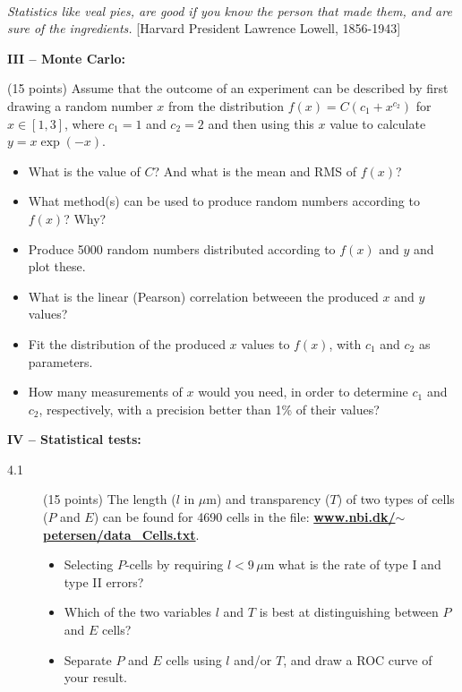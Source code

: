 \documentclass[11pt]{article}
\begin{document}

\noindent
\hrulefill\\
\emph{Statistics like veal pies, are good if you know the person that made them, and are sure of the ingredients.}
  \phantom{} \hfill [Harvard President Lawrence Lowell, 1856-1943]\\[-2ex]



\newpage

\noindent
{\bf III -- Monte Carlo:}
\begin{description}
\vspace*{-1ex}
\item[3.1] (15 points) Assume that the outcome of an experiment can be described by
  first drawing a random number $x$ from the distribution $f(x) = C (c_1 + x^{c_2})$ for $x \in [1, 3]$,
  where $c_1 = 1$ and $c_2 = 2$ and then using this $x$ value to calculate $y = x \exp(-x)$.
  \begin{itemize}
    \item What is the value of $C$? And what is the mean and RMS of $f(x)$?
    \item What method(s) can be used to produce random numbers according to $f(x)$? Why?
    \item Produce 5000 random numbers distributed according to $f(x)$ and $y$ and plot these.
    \item What is the linear (Pearson) correlation betweeen the produced $x$ and $y$ values?
    \item Fit the distribution of the produced $x$ values to $f(x)$, with $c_1$ and $c_2$ as parameters.
    \item How many measurements of $x$ would you need, in order to determine $c_1$ and $c_2$,
      respectively, with a precision better than 1\% of their values?
  \end{itemize}
\end{description}



\noindent
{\bf IV -- Statistical tests:}
\begin{description}
\item[4.1] (15 points)
  The length ($l$ in $\mu$m) and transparency ($T$) of two types of cells ($P$ and $E$) can be found for
  4690 cells in the file:
  \href{http://www.nbi.dk/~petersen/data\_Cells.txt}{\bf www.nbi.dk/$\sim$petersen/data\_Cells.txt}.
  \vspace*{-1ex}
  \begin{itemize}
    \item Selecting $P$-cells by requiring $l < 9 \,\mu$m what is the rate of type I and type II errors?
    \item Which of the two variables $l$ and $T$ is best at distinguishing between $P$ and $E$ cells?
    \item Separate $P$ and $E$ cells using $l$ and/or $T$, and draw a ROC curve of your result.
  \end{itemize}
\end{description}
\end{document}
